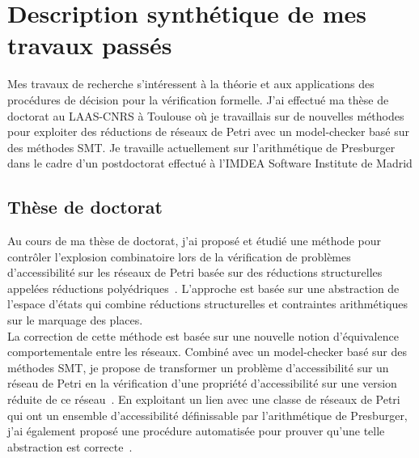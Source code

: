 \label{sec:recherche}


\vspace{10pt}
\section*{Description synthétique de mes travaux passés}
\vspace{10pt}

Mes travaux de recherche s'intéressent à la théorie et aux applications des
procédures de décision pour la vérification formelle. J'ai effectué ma thèse de
doctorat au LAAS-CNRS à Toulouse où je travaillais sur de nouvelles méthodes
pour exploiter des réductions de réseaux de Petri avec un model-checker basé sur
des méthodes SMT. Je travaille actuellement sur l'arithmétique de Presburger
dans le cadre d'un postdoctorat effectué à l'IMDEA Software Institute de Madrid

\vspace{10pt}
\subsection*{Thèse de doctorat}
\vspace{10pt}


Au cours de ma thèse de doctorat, j'ai proposé et étudié une méthode pour
contrôler l'explosion combinatoire lors de la vérification de problèmes
d'accessibilité sur les réseaux de Petri basée sur des réductions structurelles
appelées réductions polyédriques~\cite{amat_combination_2021,amat_polyhedral_2022}. L'approche est basée
sur une abstraction de l'espace d'états qui combine réductions structurelles et
contraintes arithmétiques sur le marquage des places.\\

La correction de cette méthode est basée sur une nouvelle notion d'équivalence
comportementale entre les réseaux. Combiné avec un model-checker basé sur des
méthodes SMT, je propose de transformer un problème d'accessibilité sur un
réseau de Petri en la vérification d'une propriété d'accessibilité sur une
version réduite de ce réseau~\cite{amat_combination_2021,amat_polyhedral_2022}. En exploitant un lien
avec une classe de réseaux de Petri qui ont un ensemble d'accessibilité
définissable par l'arithmétique de Presburger, j'ai également proposé
une procédure automatisée pour prouver qu'une telle abstraction est
correcte~\cite{amat_automated_2023}.\\

